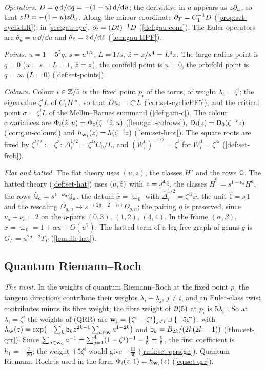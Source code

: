 \emph{Operators.} $D=q\,\mathrm{d}/\mathrm{d} q=-(1-u)\,\mathrm{d}/\mathrm{d} u$; the derivative in $u$ appears as $z\partial_u$, so that $zD=-(1-u)z\partial_u$. Along the mirror coordinate $\partial_T=C_1^{-1}D$ (\cref{prop:set-cyclicLR}); in \cref{sec:gau-cyc}, $\partial_t=(D t)^{-1}D$ (\cref{def:gau-conc}). The Euler operators are $\theta_u=u\,\dd/\dd u$ and $\theta_{\hat{z}}=\hat{z}\,\mathrm{d}/\mathrm{d}\hat{z}$ (\cref{lem:gau-HPF}).

\emph{Points.} $u=1-5^5q$, $s=u^{1/5}$, $L=1/s$, $\hat{z}=z/s^4=L^4z$. The large-radius point is $q=0$ ($u=s=L=1$, $\hat{z}=z$), the conifold point is $u=0$, the orbifold point is $q=\infty$ ($L=0$) (\cref{def:set-points}).

\emph{Colours.} Colour $i\in\mathbb{Z}/5$ is the fixed point $p_i$ of the torus, of weight $\lambda_i=\zeta^i$; the eigenvalue $\zeta^iL$ of $C_1H*$, so that $D u_i=\zeta^iL$ (\cref{cor:set-cyclicPF5}); and the critical point $\sigma=\zeta^iL$ of the Mellin--Barnes summand (\cref{def:gam-c}). The colour covariances are $\Phi_i(\hat{z},u)=\Phi_0(\zeta^{-i}\hat{z},u)$ (\cref{lem:gau-colrows}), $\mathsf{D}_i(z)=\mathsf{D}_0(\zeta^{-i}z)$ (\cref{cor:gau-colours}) and $h_{\mathbf{w}_i}(z)=h(\zeta^{-i}z)$ (\cref{lem:set-hrot}). The square roots are fixed by $\zeta^{1/2}:=\zeta^3$: $\Delta_i^{1/2}=\zeta^{4i}C_0/L$, and $(W^0_i)^{-1/2}=\zeta^i$ for $W^0_i=\zeta^{3i}$ (\cref{def:set-frob}).

\emph{Flat and hatted.} The flat theory uses $(u,z)$, the classes $H^a$ and the rows $\mathcal{Q}$. The hatted theory (\cref{def:set-hat}) uses $(u,\hat{z})$ with $z=s^4\hat{z}$, the classes $\hat H^a=s^{1-\nu_a}H^a$, the rows $\hat{\mathcal{Q}}_a=s^{1-\nu_a}\mathcal{Q}_a$, the datum $\hat x=\varpi_0$ with $\hat\Delta_i^{1/2}=\zeta^{4i}\hat x$, the unit $\hat1=s\,1$ and the rescaling $\Omega_{g,n}\mapsto s^{-(2g-2+n)}\Omega_{g,n}$; the pairing $\eta$ is preserved, since $\nu_a+\nu_b=2$ on the $\eta$-pairs $(0,3)$, $(1,2)$, $(4,4)$. In the frame $(\alpha,\beta)$, $\hat x=\varpi_0=1+\alpha u+O(u^2)$. The hatted term of a leg-free graph of genus $g$ is $G_\Gamma=u^{2g-2}T_\Gamma$ (\cref{lem:flh-hat}).

\subsection{Quantum Riemann--Roch}
\label{sec:sgn-qrr}

\emph{The twist.} In the weights of quantum Riemann--Roch at the fixed point $p_i$ the tangent directions contribute their weights $\lambda_i-\lambda_j$, $j\neq i$, and an Euler-class twist contributes minus its fibre weight; the fibre weight of $\mathcal{O}(5)$ at $p_i$ is $5\lambda_i$ \cite[(10)]{LP20}. So at $\lambda_i=\zeta^i$ the weights of (QRR) are $\mathbf{w}_i=\{\zeta^i-\zeta^j\}_{j\neq i}\cup\{-5\zeta^i\}$, with $h_{\mathbf{w}}(z)=\exp\bigl(-\sum_k\mathsf{b}_kz^{2k-1}\sum_{a\in\mathbf{w}}a^{1-2k}\bigr)$ and $\mathsf{b}_k=B_{2k}/(2k(2k-1))$ (\cref{thm:set-qrr}). Since $\sum_{a\in\mathbf{w}_0}a^{-1}=\sum_{j=1}^4(1-\zeta^j)^{-1}-\frac15=\frac95$, the first coefficient is $h_1=-\frac3{20}$; the weight $+5\zeta^i$ would give $-\frac{11}{60}$ (\cref{rmk:set-qrrsign}). Quantum Riemann--Roch is used in the form $\Phi_i(z,1)=h_{\mathbf{w}_i}(z)$ (\cref{eq:set-qrr}).

